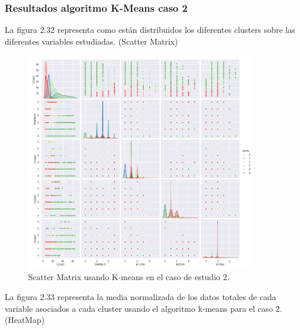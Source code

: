 
	\subsubsection{Resultados algoritmo K-Means caso 2}


	La figura 2.32 representa como están distribuidos los diferentes clusters sobre las diferentes variables estudiadas. (Scatter Matrix)\\

	\begin{figure}[htb]
		\centering
		\includegraphics[width=0.9\textwidth]{./imagenes/caso2/scatterMatrix_caso2_K-means}
		\caption{Scatter Matrix usando K-means en el caso de estudio 2.} \label{fig:1}
	\end{figure}

	La figura 2.33 representa la media normalizada de los datos totales de cada variable asociados
	a cada cluster usando el algoritmo k-means para el caso 2. (HeatMap) \\


